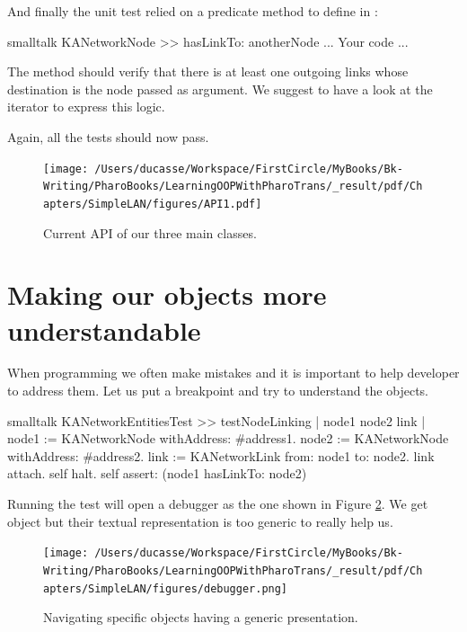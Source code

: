 \documentclass[10pt,twoside,english]{_support/latex/sbabook/sbabook}
\begin{document}
And finally the unit test relied on a predicate method to define in :

\begin{displaycode}{smalltalk}
KANetworkNode >> hasLinkTo: anotherNode
    ... Your code ...
\end{displaycode}

The method  should verify that there is at least one outgoing links whose destination is the node passed as argument.  We suggest to have a look at the iterator  to express this logic.

Again, all the tests should now pass.


\begin{figure}

\begin{center}
\texttt{[image: /Users/ducasse/Workspace/FirstCircle/MyBooks/Bk-Writing/PharoBooks/LearningOOPWithPharoTrans/\_result/pdf/Chapters/SimpleLAN/figures/API1.pdf]}\caption{Current API of our three main classes.\label{/Users/ducasse/Workspace/FirstCircle/MyBooks/Bk-Writing/PharoBooks/LearningOOPWithPharoTrans/_result/pdf/Chapters/SimpleLAN/figures/API1.pdf}}\end{center}
\end{figure}

\section{Making our objects more understandable}
When programming we often make mistakes and it is important to help developer to address them. Let us put a breakpoint and 
try to understand the objects. 

\begin{displaycode}{smalltalk}
KANetworkEntitiesTest >> testNodeLinking
	| node1 node2 link |
	node1 := KANetworkNode withAddress: #address1.
	node2 := KANetworkNode withAddress: #address2.
	link := KANetworkLink from: node1 to: node2.
	link attach.
	self halt.
	self assert: (node1 hasLinkTo: node2)
\end{displaycode}

Running the test will open a debugger as the one shown in Figure \ref{debugger}. We get object but their textual representation is too generic to really help us. 


\begin{figure}

\begin{center}
\texttt{[image: /Users/ducasse/Workspace/FirstCircle/MyBooks/Bk-Writing/PharoBooks/LearningOOPWithPharoTrans/\_result/pdf/Chapters/SimpleLAN/figures/debugger.png]}\caption{Navigating specific objects having a generic presentation.\label{debugger}}\end{center}
\end{figure}
\end{document}

